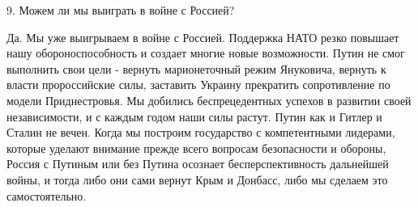 9. Можем ли мы выиграть в войне с Россией?

Да. Мы уже выигрываем в войне с Россией. Поддержка НАТО резко повышает нашу
обороноспособность и создает многие новые возможности. Путин не смог выполнить
свои цели - вернуть марионеточный режим Януковича, вернуть к власти
пророссийские силы, заставить Украину прекратить сопротивление по модели
Приднестровья. Мы добились беспрецедентных успехов в развитии своей
независимости, и с каждым годом наши силы растут. Путин как и Гитлер и Сталин
не вечен. Когда мы построим государство с компетентными лидерами, которые
уделают внимание прежде всего вопросам безопасности и обороны, Россия с
Путиным или без Путина осознает бесперспективность дальнейшей войны, и тогда
либо они сами вернут Крым и Донбасс, либо мы сделаем это самостоятельно.
